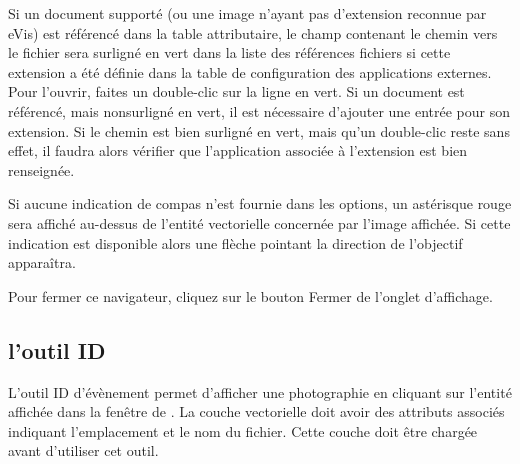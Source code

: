 Si un document supporté (ou une image n'ayant pas d'extension reconnue par eVis) est référencé dans la table attributaire, le champ contenant le chemin vers le fichier sera surligné en vert dans la liste des références fichiers si cette extension a été définie dans la table de configuration des applications externes. Pour l'ouvrir, faites un double-clic sur la ligne en vert. Si un document est référencé, mais nonsurligné en vert, il est nécessaire d'ajouter une entrée pour son extension. Si le chemin est bien surligné en vert, mais qu'un double-clic reste sans effet, il faudra alors vérifier que l'application associée à l'extension est bien renseignée.


Si aucune indication de compas n'est fournie dans les options, un astérisque rouge sera affiché au-dessus de l'entité vectorielle concernée par l'image affichée. Si cette indication est disponible alors une flèche pointant la direction de l'objectif apparaîtra.

Pour fermer ce navigateur, cliquez sur le bouton Fermer de l'onglet d'affichage.

\subsection{l'outil ID}\label{evis_id_tool}

L'outil ID d'évènement permet d'afficher une photographie en cliquant sur l'entité affichée dans la fenêtre de \qg. La couche vectorielle doit avoir des attributs associés indiquant l'emplacement et le nom du fichier. Cette couche doit être chargée avant d'utiliser cet outil.
